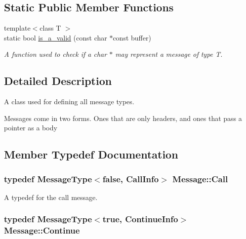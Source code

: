 \subsection*{Static Public Member Functions}
\begin{DoxyCompactItemize}
\item 
{\footnotesize template$<$class T $>$ }\\static bool \hyperlink{class_message_ada73859c8d199a7925b0ba3999cc3eef}{is\+\_\+a\+\_\+valid} (const char $\ast$const buffer)
\begin{DoxyCompactList}\small\item\em A function used to check if a char $\ast$ may represent a message of type T. \end{DoxyCompactList}\end{DoxyCompactItemize}


\subsection{Detailed Description}
A class used for defining all message types. 

Messages come in two forms. Ones that are only headers, and ones that pass a pointer as a body 

\subsection{Member Typedef Documentation}
\subsubsection[{\texorpdfstring{Call}{Call}}]{\setlength{\rightskip}{0pt plus 5cm}typedef {\bf Message\+Type}$<$false, {\bf Call\+Info}$>$ {\bf Message\+::\+Call}}\hypertarget{class_message_a0fd0ed431cb0d672045d09368a5d2126}{}\label{class_message_a0fd0ed431cb0d672045d09368a5d2126}


A typedef for the call message. 

\subsubsection[{\texorpdfstring{Continue}{Continue}}]{\setlength{\rightskip}{0pt plus 5cm}typedef {\bf Message\+Type}$<$true, {\bf Continue\+Info}$>$ {\bf Message\+::\+Continue}}\hypertarget{class_message_a04de61b84a209cdf372b6f53f3adf7c4}{}\label{class_message_a04de61b84a209cdf372b6f53f3adf7c4}


